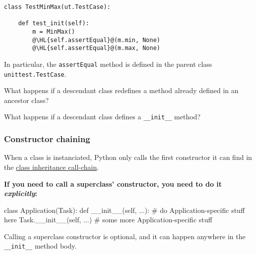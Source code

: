 \documentclass[english,serif,mathserif,xcolor=pdftex,dvipsnames,table]{beamer}
\begin{document}
\begin{frame}[fragile]
\begin{lstlisting}
class TestMinMax(ut.TestCase):

    def test_init(self):
        m = MinMax()
        @\HL{self.assertEqual}@(m.min, None)
        @\HL{self.assertEqual}@(m.max, None)
\end{lstlisting}

  \+
  In particular, the \texttt{assertEqual} method is defined in the
  parent class \texttt{unittest.TestCase}.
\end{frame}


\begin{frame}
  What happens if a descendant class redefines a method already
  defined in an ancestor class?

  \+
\end{frame}


\begin{frame}
  What happens if a descendant class defines a \lstinline|__init__|
  method?

  \+ 
\end{frame}


\begin{frame}[fragile]
  \frametitle{Constructor chaining}

    When a class is instanciated, Python only calls the first
    constructor it can find in the
    \href{http://www.python.org/download/releases/2.3/mro/}{class inheritance call-chain}.

    \+ \textbf{If you need to call a superclass' constructor, you need
      to do it \emph{explicitly}:}
    \begin{python}
class Application(Task):
  def __init__(self, ...):
    # do Application-specific stuff here
    Task.__init__(self, ...)
    # some more Application-specific stuff
    \end{python}

    \+
    Calling a superclass constructor is optional, and
    it can happen anywhere in the \lstinline|__init__| method body.
\end{frame}
\end{document}
